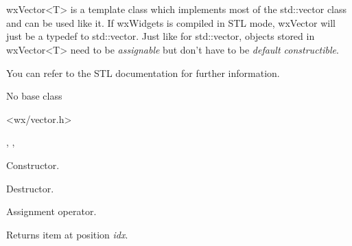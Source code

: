 \section{}\label{wxvector}

wxVector<T> is a template class which implements most of the std::vector
class and can be used like it. If wxWidgets is compiled in STL mode,
wxVector will just be a typedef to std::vector. Just like for std::vector,
objects stored in wxVector<T> need to be {\it assignable} but don't have to
be {\it default constructible}.

You can refer to the STL documentation for further information.


No base class


<wx/vector.h>


, 
,

\label{wxvectorwxvector}



Constructor.

\label{wxvectordtor}


Destructor.

\label{wxvectoroperatorassign}


Assignment operator.

\label{wxvectorat}



Returns item at position {\it idx}.

\label{wxvectorback}



